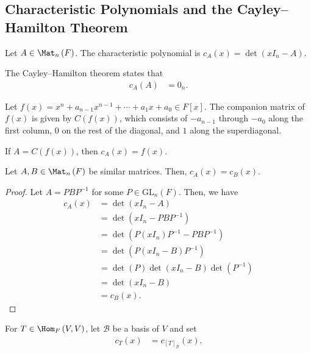 \documentclass[10pt]{mypackage}
\begin{document}
\subsection{Characteristic Polynomials and the Cayley--Hamilton Theorem}%
\begin{definition}
  Let $A \in \Mat_{n}\left(F\right)$. The characteristic polynomial is $c_{A}\left(x\right) = \det\left(xI_n - A\right)$.
\end{definition}
\begin{remark}
  The Cayley--Hamilton theorem states that
  \begin{align*}
    c_A(A) &=0_{n}.
  \end{align*}
\end{remark}
\begin{definition}
  Let $f(x) = x^n + a_{n-1}x^{n-1} +  \cdots + a_1 x + a_0\in F[x]$. The companion matrix of $f(x)$ is given by $C\left(f(x)\right)$, which consists of $-a_{n-1}$ through $-a_0$ along the first column, $0$ on the rest of the diagonal, and $1$ along the superdiagonal.
\end{definition}
\begin{lemma}
  If $A = C\left(f(x)\right)$, then $c_{A}\left(x\right) = f(x)$.
\end{lemma}
\begin{lemma}
  Let $A,B\in \Mat_{n}\left(F\right)$ be similar matrices. Then, $c_{A}\left(x\right) = c_{B}\left(x\right)$.
\end{lemma}
\begin{proof}
  Let $A = PBP^{-1}$ for some $P\in \text{GL}_{n}\left(F\right)$. Then, we have
  \begin{align*}
    c_{A}\left(x\right) &= \det\left(xI_{n} - A\right)\\
                        &= \det\left(xI_{n}- PBP^{-1}\right)\\
                        &= \det\left(P\left(xI_n\right)P^{-1}-PBP^{-1}\right)\\
                        &= \det\left(P\left(xI_n - B\right)P^{-1}\right)\\
                        &= \det\left(P\right)\det\left(xI_n-B\right)\det\left(P^{-1}\right)\\
                        &= \det\left(xI_n - B\right)\\
                        &= c_B\left(x\right).
  \end{align*}
\end{proof}
\begin{definition}
  For $T\in \Hom_{F}\left(V,V\right)$, let $\mathcal{B}$ be a basis of $V$ and set
  \begin{align*}
    c_T(x) &= c_{\left[T\right]_{\mathcal{B}}}(x).
  \end{align*}
\end{definition}
\end{document}
